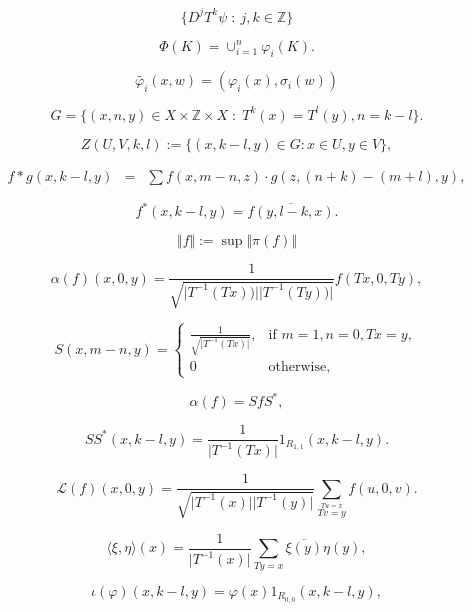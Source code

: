 \documentclass{article}
\begin{document}
\[
\{ D^{j}T^{k}\psi\;:\: j,k\in\mathbb{Z}\}\]

\[
\Phi(K)=\cup_{i=1}^{n}\varphi_{i}(K).\]

\[
\tilde{\varphi_{i}}(x,w)=(\varphi_{i}(x),\sigma_{i}(w))\]

\[
G=\{(x,n,y)\in X\times\mathbb{Z}\times X\;:\; T^{k}(x)=T^{l}(y),n=k-l\}.\]

\[
Z(U,V,k,l):=\{(x,k-l,y)\in G:x\in U,y\in V\},\]

\begin{eqnarray*}
f\ast g(x,k-l,y) & = & \sum f(x,m-n,z)\cdot g(z,(n+k)-(m+l),y),\end{eqnarray*}

\[
f^{*}(x,k-l,y)=\overline{f(y,l-k,x)}.\]

\[
\Vert f\Vert:=\sup\Vert\pi(f)\Vert\]

\begin{equation}
\alpha(f)(x,0,y)=\frac{1}{\sqrt{\vert T^{-1}(Tx))\vert\vert
T^{-1}(Ty))\vert}}f(Tx,0,Ty),\label{eq:alphainfty}\end{equation}

\begin{equation}
S(x,m-n,y)=\begin{cases}
\frac{1}{\sqrt{\vert T^{-1}(Tx)\vert}}, & \mbox{if }m=1,n=0,Tx=y,\\
0 & \mbox{otherwise,}\end{cases}\label{eq:isometry}\end{equation}

\begin{equation}
\alpha(f)=SfS^{\ast},\label{eq:Stacey1}\end{equation}

\begin{equation}
SS^{*}(x,k-l,y)=\frac{1}{\vert
T^{-1}(Tx)\vert}1_{R_{1,1}}(x,k-l,y).\label{eq:Stacey2}\end{equation}

\begin{equation}
\mathcal{L}(f)(x,0,y)=\frac{1}{\sqrt{\vert T^{-1}(x)\vert\vert
T^{-1}(y)\vert}}\sum_{\stackrel{Tu=x}{Tv=y}}f(u,0,v).\label{eq:transferinfty}
\end{equation}

\[
\langle\xi,\eta\rangle(x)=\frac{1}{\vert
T^{-1}(x)\vert}\sum_{Ty=x}\overline{\xi(y)}\eta(y),\]

\[
\iota(\varphi)(x,k-l,y)=\varphi(x)1_{R_{0,0}}(x,k-l,y),\]
\end{document}
